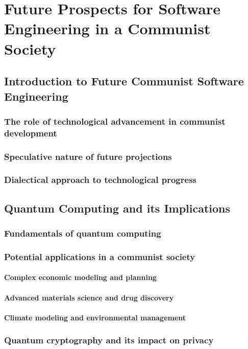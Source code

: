 \chapter{Future Prospects for Software Engineering in a Communist Society}

\section{Introduction to Future Communist Software Engineering}
\subsection{The role of technological advancement in communist development}
\subsection{Speculative nature of future projections}
\subsection{Dialectical approach to technological progress}

\newpage

\section{Quantum Computing and its Implications}
\subsection{Fundamentals of quantum computing}
\subsection{Potential applications in a communist society}
\subsubsection{Complex economic modeling and planning}
\subsubsection{Advanced materials science and drug discovery}
\subsubsection{Climate modeling and environmental management}
\subsection{Quantum cryptography and its impact on privacy}
